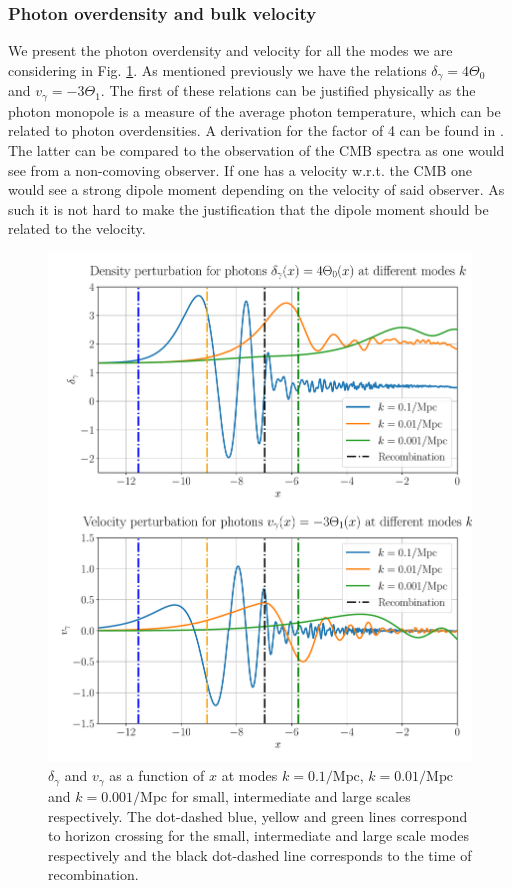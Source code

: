 \documentclass[%
reprint,
 amsmath,amssymb,
 aps,
]{revtex4-2}
\begin{document}
\subsubsection{Photon overdensity and bulk velocity}
We present the photon overdensity and velocity for all the modes we are considering in Fig. \ref{fig:gamma}. As mentioned previously we have the relations $\delta_\gamma=4\Theta_0$ and $v_\gamma=-3\Theta_1$.  The first of these relations can be justified physically as the photon monopole is a measure of the average photon temperature, which can be related to photon overdensities. A derivation for the factor of 4 can be found in \cite{AST5220LectureNotes}. The latter can be compared to the observation of the CMB spectra as one would see from a non-comoving observer. If one has a velocity w.r.t. the CMB one would see a strong dipole moment depending on the velocity of said observer. As such it is not hard to make the justification that the dipole moment should be related to the velocity. 
\begin{figure}[ht!]
	\includegraphics[width = \linewidth]{Figures/gamma.pdf}
	\caption{$\delta_\gamma$ and $v_\gamma$ as a function of $x$ at modes $k=0.1/\text{Mpc}$, $k=0.01/\text{Mpc}$ and $k=0.001/\text{Mpc}$ for small, intermediate and large scales respectively. The dot-dashed blue, yellow and green lines correspond to horizon crossing for the small, intermediate and large scale modes respectively and the black dot-dashed line corresponds to the time of recombination.}
	\label{fig:gamma}
\end{figure}
\end{document}

